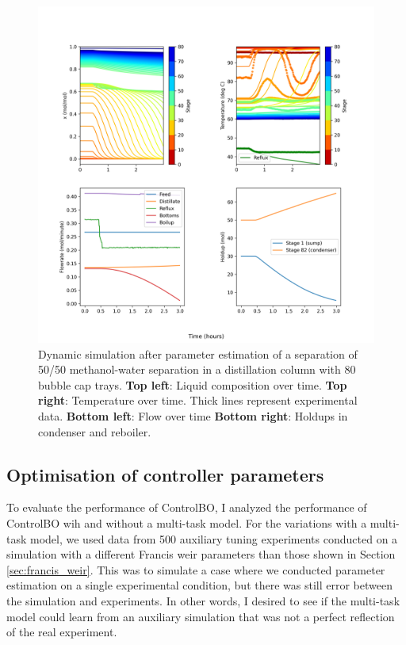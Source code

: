 \begin{figure}
    \centering
    \includegraphics[width=\textwidth]{gfx/Chapter06/2021_11_17_closed_loop_dynamic.png}
    \caption{Dynamic simulation after parameter estimation of a separation of 50/50 methanol-water separation in a distillation column with 80 bubble cap trays. \textbf{Top left}: Liquid composition over time. \textbf{Top right}: Temperature over time. Thick lines represent experimental data. \textbf{Bottom left}: Flow over time \textbf{Bottom right}: Holdups in condenser and reboiler.}
    \label{fig:dynamic_nominal}
\end{figure}

\subsection{Optimisation of controller parameters}

To evaluate the performance of ControlBO, I analyzed the performance of ControlBO wih and without a multi-task model.  For the variations with a multi-task model, we used data from  500 auxiliary tuning experiments conducted on a simulation with a different Francis weir parameters than those shown in Section \ref{sec:francis_weir}. This was to simulate a case where we conducted parameter estimation on a single experimental condition, but there was still error between the simulation and experiments. In other words, I desired to see if the multi-task model could learn from an auxiliary simulation that was not a perfect reflection of the real experiment.  

